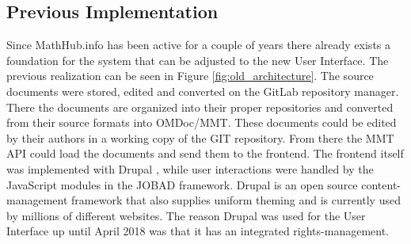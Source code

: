 \documentclass[11pt,a4paper]{article}
\begin{document}
\subsection{Previous Implementation} \label{previous}
Since MathHub.info has been active for a couple of years there already exists a foundation for the system that can be adjusted to the new User Interface.
The previous realization can be seen in Figure \ref{fig:old_architecture}.
The source documents were stored, edited and converted on the GitLab repository manager.
There the documents are organized into their proper repositories and converted from their source formats into OMDoc/MMT.
These documents could be edited by their authors in a working copy of the GIT repository.
From there the MMT API could load the documents and send them to the frontend.
The frontend itself was implemented with Drupal \cite{comp}, while user interactions were handled by the JavaScript modules in the JOBAD framework.
Drupal is an open source content-management framework that also supplies uniform theming and is currently used by millions of different websites.
The reason Drupal was used for the User Interface up until April 2018 was that it has an integrated rights-management.
\end{document}
